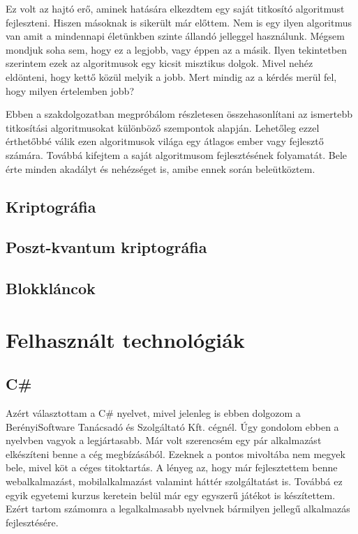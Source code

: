 \documentclass[12pt]{report} %
\begin{document}
Ez volt az hajtó erő, aminek hatására elkezdtem egy saját titkosító algoritmust fejleszteni. Hiszen másoknak is sikerült már előttem. Nem is egy ilyen algoritmus van amit a mindennapi életünkben szinte állandó jelleggel használunk. Mégsem mondjuk soha sem, hogy ez a legjobb, vagy éppen az a másik. Ilyen tekintetben szerintem ezek az algoritmusok egy kicsit misztikus dolgok. Mivel nehéz eldönteni, hogy kettő közül melyik a jobb. Mert mindig az a kérdés merül fel, hogy milyen értelemben jobb?

Ebben a szakdolgozatban megpróbálom részletesen összehasonlítani az ismertebb titkosítási algoritmusokat különböző szempontok alapján. Lehetőleg ezzel érthetőbbé válik ezen algoritmusok világa egy átlagos ember vagy fejlesztő számára. Továbbá kifejtem a saját algoritmusom fejlesztésének folyamatát. Bele érte minden akadályt és nehézséget is, amibe ennek során beleütköztem.

\section{Kriptográfia} %

\section{Poszt-kvantum kriptográfia} %

\section{Blokkláncok} %

\chapter{Felhasznált technológiák} %

\section{C\#} %

Azért választottam a C\# nyelvet, mivel jelenleg is ebben dolgozom a BerényiSoftware Tanácsadó és Szolgáltató Kft. cégnél. Úgy gondolom ebben a nyelvben vagyok a legjártasabb. Már volt szerencsém egy pár alkalmazást elkészíteni benne a cég megbízásából. Ezeknek a pontos mivoltába nem megyek bele, mivel köt a céges titoktartás. A lényeg az, hogy már fejlesztettem benne webalkalmazást, mobilalkalmazást valamint háttér szolgáltatást is. Továbbá ez egyik egyetemi kurzus keretein belül már egy egyszerű játékot is készítettem. Ezért tartom számomra a legalkalmasabb nyelvnek bármilyen jellegű alkalmazás fejlesztésére.
\end{document}
